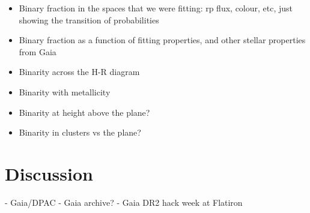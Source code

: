 \documentclass[twocolumn]{aastex61}
\begin{document}
\begin{itemize}

\item Binary fraction in the spaces that we were fitting: rp flux, colour, etc, just showing the transition of  probabilities

\item Binary fraction as a function of fitting properties, and other stellar properties from Gaia

\item Binarity across the H-R diagram

\item Binarity with metallicity 

\item Binarity at height above the plane?

\item Binarity in clusters vs the plane?
\end{itemize}

\section{Discussion}




\acknowledgements
- Gaia/DPAC
- Gaia archive?
- Gaia DR2 hack week at Flatiron
\end{document}

